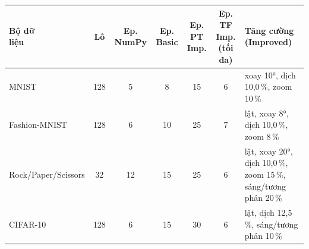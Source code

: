 \begin{tabular}{lcccccp{5.2cm}}
\toprule
\makecell[l]{Bộ dữ\\liệu} & Lô & Ep. NumPy & Ep. Basic & \makecell[c]{Ep. PT\\Imp.} & \makecell[c]{Ep. TF Imp.\\(tối đa)} & \makecell[l]{Tăng cường\\(Improved)} \\
\midrule
MNIST & 128 & 5 & 8 & 15 & 6 & xoay 10°, dịch 10{,}0\,\%, zoom 10\,\% \\
Fashion-MNIST & 128 & 6 & 10 & 25 & 7 & lật, xoay 8°, dịch 10{,}0\,\%, zoom 8\,\% \\
Rock/Paper/Scissors & 32 & 12 & 15 & 25 & 6 & lật, xoay 20°, dịch 10{,}0\,\%, zoom 15\,\%, sáng/tương phản 20\,\% \\
CIFAR-10 & 128 & 6 & 15 & 30 & 6 & lật, dịch 12{,}5\,\%, sáng/tương phản 10\,\% \\
\bottomrule
\end{tabular}
